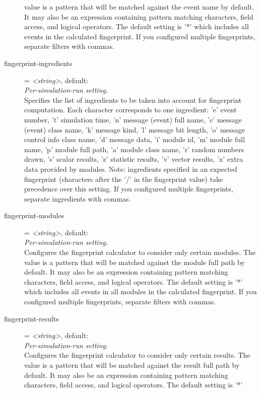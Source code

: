 \begin{description}
    value is a pattern that will be matched against the event name by default.
    It may also be an expression containing pattern matching characters, field
    access, and logical operators. The default setting is '*' which includes
    all events in the calculated fingerprint. If you configured multiple
    fingerprints, separate filters with commas.
\item[fingerprint-ingredients] = \textit{<string>}, default: \\
    \textit{Per-simulation-run setting.}\\
    Specifies the list of ingredients to be taken into account for fingerprint
    computation. Each character corresponds to one ingredient: 'e' event
    number, 't' simulation time, 'n' message (event) full name, 'c' message
    (event) class name, 'k' message kind, 'l' message bit length, 'o' message
    control info class name, 'd' message data, 'i' module id, 'm' module full
    name, 'p' module full path, 'a' module class name, 'r' random numbers
    drawn, 's' scalar results, 'z' statistic results, 'v' vector results, 'x'
    extra data provided by modules. Note: ingredients specified in an expected
    fingerprint (characters after the '/' in the fingerprint value) take
    precedence over this setting. If you configured multiple fingerprints,
    separate ingredients with commas.
\item[fingerprint-modules] = \textit{<string>}, default: \ttt{*}\\
    \textit{Per-simulation-run setting.}\\
    Configures the fingerprint calculator to consider only certain modules. The
    value is a pattern that will be matched against the module full path by
    default. It may also be an expression containing pattern matching
    characters, field access, and logical operators. The default setting is '*'
    which includes all events in all modules in the calculated fingerprint. If
    you configured multiple fingerprints, separate filters with commas.
\item[fingerprint-results] = \textit{<string>}, default: \ttt{*}\\
    \textit{Per-simulation-run setting.}\\
    Configures the fingerprint calculator to consider only certain results. The
    value is a pattern that will be matched against the result full path by
    default. It may also be an expression containing pattern matching
    characters, field access, and logical operators. The default setting is '*'

\end{description}
